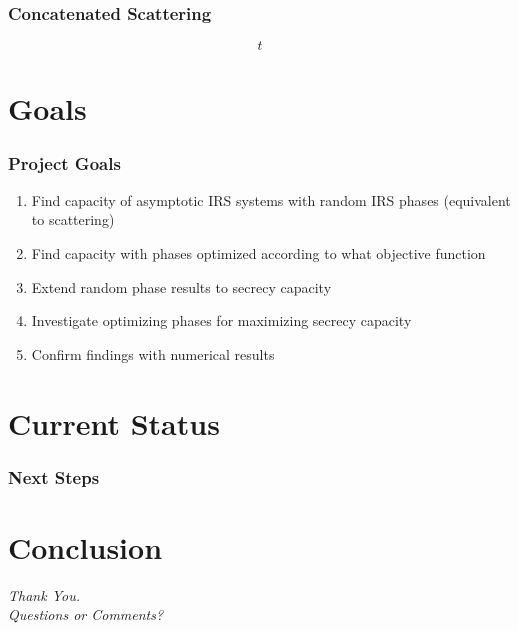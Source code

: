 \documentclass[10pt,tgadventor, onlymath]{beamer}
\begin{document}
\begin{frame}
\frametitle{Concatenated Scattering}
\begin{equation}
t
\end{equation}
\end{frame}

\section{Goals}
\begin{frame}
\frametitle{Project Goals}
\begin{enumerate}
\item
	Find capacity of asymptotic IRS systems with random IRS phases (equivalent to scattering)
\item 
	Find capacity with phases optimized according to what objective function
\item
	Extend random phase results to secrecy capacity
\item
	Investigate optimizing phases for maximizing secrecy capacity
\item 
	Confirm findings with numerical results
\end{enumerate}
\end{frame}

\section{Current Status}



\begin{frame}
\frametitle{Next Steps}

\end{frame}


\section{Conclusion}

\begin{frame}
  \centering \Large
  \emph{Thank You.}
  \\
	\bigskip
    \centering \Large
  \emph{Questions or Comments?}

\end{frame}
\end{document}
